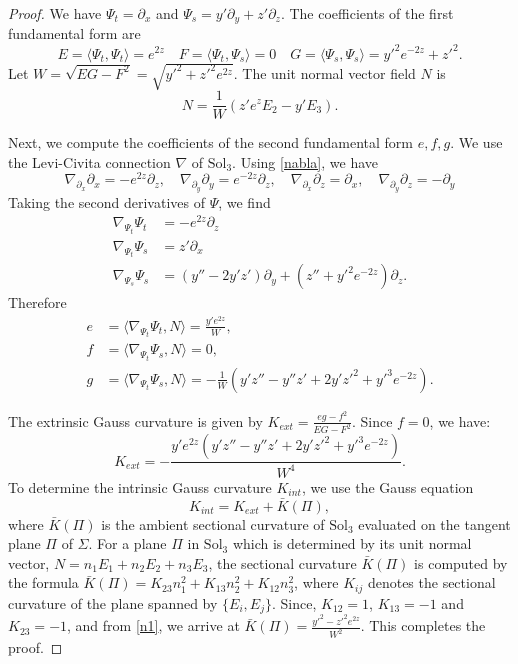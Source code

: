 \documentclass[a4paper,12pt]{amsart}
\theoremstyle{plain}
\theoremstyle{definition}
\begin{document}
\begin{proof}
We have $\Psi_t = \partial_x $ and $\Psi_s = y' \partial_y + z' \partial_z$. The coefficients of the first fundamental form are 
$$
E = \langle \Psi_t, \Psi_t \rangle = e^{2z} \quad F = \langle \Psi_t, \Psi_s \rangle = 0 \quad G = \langle \Psi_s, \Psi_s \rangle = y'^2 e^{-2z} + z'^2.$$
Let $W=\sqrt{EG-F^2}=\sqrt{ y'^2 + z'^2 e^{2z} }$.
The unit normal vector field $N$ is 
\begin{equation}\label{n1}
N = \frac{1}{W} \left( z' e^z E_2 - y' E_3 \right).
\end{equation}

Next, we compute the coefficients of the second fundamental form $e, f, g$. We use the Levi-Civita connection $\nabla$ of $\text{Sol}_3$. Using \eqref{nabla}, we have 
\begin{equation*}
\nabla_{\partial_x} \partial_x = -e^{2z} \partial_z, \quad \nabla_{\partial_y} \partial_y = e^{-2z} \partial_z, \quad \nabla_{\partial_x} \partial_z = \partial_x, \quad \nabla_{\partial_y} \partial_z = -\partial_y
\end{equation*}
Taking the second derivatives of $\Psi$, we find
\begin{align*}
\nabla_{\Psi_t} \Psi_t &= -e^{2z} \partial_z \\
\nabla_{\Psi_t} \Psi_s &= z' \partial_x \\
\nabla_{\Psi_s} \Psi_s &= (y'' - 2y'z') \partial_y + \left( z'' + y'^2 e^{-2z} \right) \partial_z.
\end{align*}
Therefore 
\begin{align*}
e &= \langle \nabla_{\Psi_t} \Psi_t, N \rangle = \frac{y' e^{2z}}{W}, \\
f &= \langle \nabla_{\Psi_t} \Psi_s, N \rangle = 0, \\
g &= \langle \nabla_{\Psi_t} \Psi_s, N \rangle = - \frac{1}{W} \left( y' z'' - y'' z' + 2y'z'^2 + y'^3 e^{-2z} \right).
\end{align*}

The extrinsic Gauss curvature is given by $K_{ext} = \frac{eg - f^2}{EG - F^2}$. Since $f=0$, we have:
\begin{equation*}
K_{ext} = -\frac{y' e^{2z} \left( y' z'' - y'' z' + 2y'z'^2 + y'^3 e^{-2z} \right)}{W^4}.
\end{equation*}
To determine the intrinsic Gauss curvature $K_{int}$, we use the Gauss equation
\begin{equation*}
K_{int} = K_{ext} + \bar{K}(\Pi),
\end{equation*}
where $\bar{K}(\Pi)$ is the ambient sectional curvature of $\text{Sol}_3$ evaluated on the tangent plane $\Pi$ of $\Sigma$. 
 For a plane $\Pi$ in $\text{Sol}_3$ which is determined by its unit normal vector, $N = n_1 E_1 + n_2 E_2 + n_3 E_3$, the sectional curvature $\bar{K}(\Pi)$ is computed by the formula $\bar{K}(\Pi) = K_{23} n_1^2 + K_{13} n_2^2 + K_{12} n_3^2$, 
where $K_{ij}$ denotes the sectional curvature of the plane spanned by $\{E_i, E_j\}$. Since, $K_{12} = 1$, $K_{13} = -1$ and $K_{23} = -1$, and from \eqref{n1}, we arrive at $
\bar{K}(\Pi) = \frac{y'^2 - z'^2 e^{2z}}{W^2}$. This completes the proof.
\end{proof}
\end{document}
